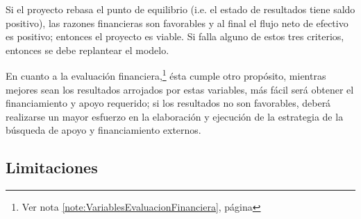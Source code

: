 
Si el proyecto rebasa el punto de equilibrio (i.e. el estado de resultados tiene saldo positivo), las razones financieras son favorables y al final el flujo neto de efectivo es positivo; entonces el proyecto es viable. Si falla alguno de estos tres criterios, entonces se debe replantear el modelo.

En cuanto a la evaluación financiera,\footnote{Ver nota \ref{note:VariablesEvaluacionFinanciera}, página \pageref{note:VariablesEvaluacionFinanciera}} ésta cumple otro propósito, mientras mejores sean los resultados arrojados por estas variables, más fácil será obtener el financiamiento y apoyo requerido; si los resultados no son favorables, deberá realizarse un mayor esfuerzo en la elaboración y ejecución de la estrategia de la búsqueda de apoyo y financiamiento externos.

\subsection{Limitaciones}
\label{sub:intro:Limitaciones}








